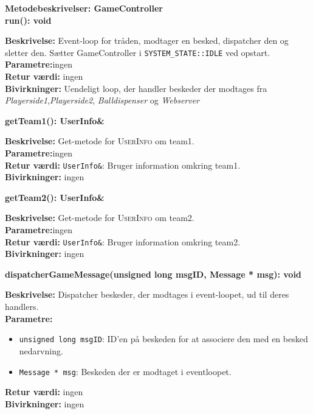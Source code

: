 \documentclass[Softwaredesign/Softwaredesign_main.tex]{subfiles}
\begin{document}
{\large\textbf{Metodebeskrivelser: GameController}}\\[0.2cm]
\textbf{run(): void}
\begin{adjustwidth}{1cm}{0pt}
\textbf{Beskrivelse:} Event-loop for tråden, modtager en besked, dispatcher den og sletter den. Sætter GameController i \lstinline{SYSTEM_STATE::IDLE} ved opstart.\\[0.2cm]
\textbf{Parametre:}ingen \\[0.2cm]
\textbf{Retur værdi:} ingen \\[0.2cm]
\textbf{Bivirkninger:} Uendeligt loop, der handler beskeder der modtages fra \textit{Playerside1},\textit{Playerside2}, \textit{Balldispenser} og \textit{Webserver}\\[0.2cm]
\end{adjustwidth}

\textbf{getTeam1(): UserInfo\&}
\begin{adjustwidth}{1cm}{0pt}
\textbf{Beskrivelse:}  Get-metode for \textsc{UserInfo} om team1.\\[0.2cm]
\textbf{Parametre:}ingen \\[0.2cm]
\textbf{Retur værdi:}
\lstinline{UserInfo&}: Bruger information omkring team1.
\\[0.2cm]
\textbf{Bivirkninger:} ingen\\[0.2cm]
\end{adjustwidth}

\textbf{getTeam2(): UserInfo\&}
\begin{adjustwidth}{1cm}{0pt}
\textbf{Beskrivelse:}  Get-metode for \textsc{UserInfo} om team2.\\[0.2cm]
\textbf{Parametre:}ingen \\[0.2cm]
\textbf{Retur værdi:} \lstinline{UserInfo&}: Bruger information omkring team2.
\\[0.2cm]
\textbf{Bivirkninger:} ingen\\[0.2cm]
\end{adjustwidth}

\textbf{dispatcherGameMessage(unsigned long msgID, Message * msg): void}
\begin{adjustwidth}{1cm}{0pt}
\textbf{Beskrivelse:}  Dispatcher beskeder, der modtages i event-loopet, ud til deres handlers.\\[0.2cm]
\textbf{Parametre:}
\begin{itemize}
    \item \lstinline{unsigned long msgID}: ID'en på beskeden for at associere den med en besked nedarvning.
    \item \lstinline{Message * msg}: Beskeden der er modtaget i eventloopet.
\end{itemize}
\textbf{Retur værdi:} ingen \\[0.2cm]
\textbf{Bivirkninger:} ingen\\[0.2cm]
\end{adjustwidth}
\end{document}
